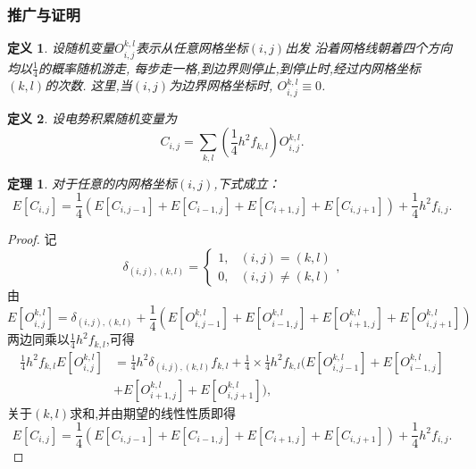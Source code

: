 \documentclass[UTF8,a4paper,notitlepage]{ctexart}%
\newtheorem{definition}{定义}
\newtheorem{thm}{定理}[section]
\theoremstyle{nonumberplain}
\newtheorem{proof}{证明}%
\begin{document}
\subsubsection*{推广与证明}
\begin{definition}
设随机变量$O_{i,j}^{k,l}$表示从任意网格坐标$(i,j)$出发
沿着网格线朝着四个方向均以$\frac{1}{4}$的概率随机游走,
每步走一格,到边界则停止,到停止时,经过内网格坐标$(k,l)$的次数.
这里,当$(i,j)$为边界网格坐标时,
$O_{i,j}^{k,l}\equiv 0$.
\end{definition}
\begin{definition}
设电势积累随机变量为
\begin{equation}
    C_{i,j}=\sum\limits_{k,l}\left(\frac{1}{4}h^2f_{k,l}\right)O_{i,j}^{k,l} .\nonumber
\end{equation}
\end{definition}
\begin{thm}
    对于任意的内网格坐标$(i,j)$,下式成立：
    \begin{equation}
        E[C_{i,j}]=
\frac{1}{4}
(E[C_{i,j-1}]+E[C_{i-1,j}]+
E[C_{i+1,j}]+E[C_{i,j+1}])+\frac{1}{4}h^2f_{i,j} .\nonumber
    \end{equation}
\end{thm}
\begin{proof}
    记
    \begin{equation}
        \delta_{(i,j),(k,l)}=\begin{cases}
            1,&(i,j)=(k,l)\\
            0,&(i,j)\neq (k,l)\nonumber
        \end{cases},
    \end{equation}
    由
    \begin{equation}
        E[O_{i,j}^{k,l}]=\delta_{(i,j),(k,l)}
        +\frac{1}{4}
        (E[O_{i,j-1}^{k,l}]+E[O_{i-1,j}^{k,l}]+
        E[O_{i+1,j}^{k,l}]+E[O_{i,j+1}^{k,l}])\nonumber
    \end{equation}
两边同乘以$\frac{1}{4}h^2f_{k,l}$,可得
\begin{equation}
    \begin{split}
        \frac{1}{4}h^2f_{k,l}E[O_{i,j}^{k,l}]
        &=\frac{1}{4}h^2\delta_{(i,j),(k,l)}f_{k,l}
        +\frac{1}{4}\times\frac{1}{4}h^2f_{k,l}
        (E[O_{i,j-1}^{k,l}]+E[O_{i-1,j}^{k,l}]\\
        &+E[O_{i+1,j}^{k,l}]+E[O_{i,j+1}^{k,l}]),\nonumber
    \end{split}
\end{equation}
关于$(k,l)$求和,并由期望的线性性质即得
\begin{equation}
        E[C_{i,j}]=
\frac{1}{4}
(E[C_{i,j-1}]+E[C_{i-1,j}]+
E[C_{i+1,j}]+E[C_{i,j+1}])+\frac{1}{4}h^2f_{i,j} .\nonumber 
\end{equation}
\end{proof}
\end{document}
